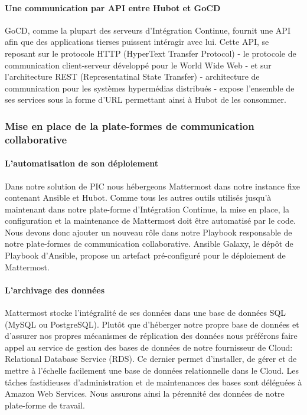           \paragraph{Une communication par API entre Hubot et GoCD}
          GoCD, comme la plupart des serveurs d'Intégration Continue, fournit une API afin que des applications tierses puissent intéragir avec lui. Cette API, se reposant sur le protocole HTTP (HyperText Transfer Protocol) - le protocole de communication client-serveur développé pour le World Wide Web - et sur l'architecture REST (Representatinal State Transfer) - architecture de communication pour les systèmes hypermédias distribués - expose l'ensemble de ses services sous la forme d'URL permettant ainsi à Hubot de les consommer.

        \subsubsection{Mise en place de la plate-formes de communication collaborative}

          \paragraph{L'automatisation de son déploiement}
          Dans notre solution de PIC nous hébergeons Mattermost dans notre instance fixe contenant Ansible et Hubot. Comme tous les autres outils utilisés jusqu'à maintenant dans notre plate-forme d'Intégration Continue, la mise en place, la configuration et la maintenance de Mattermost doit être automatisé par le code. Nous devons donc ajouter un nouveau rôle dans notre Playbook responsable de notre plate-formes de communication collaborative. Ansible Galaxy, le dépôt de Playbook d'Ansible, propose un artefact pré-configuré pour le déploiement de Mattermost.

          \paragraph{L'archivage des données}
          Mattermost stocke l'intégralité de ses données dans une base de données SQL (MySQL ou PostgreSQL). Plutôt que d'héberger notre propre base de données et d'assurer nos propres mécanismes de réplication des données nous préférons faire appel au service de gestion des bases de données de notre fournisseur de Cloud: Relational Database Service (RDS). Ce dernier permet d'installer, de gérer et de mettre à l'échelle facilement une base de données relationnelle dans le Cloud. Les tâches fastidieuses d'administration et de maintenances des bases sont déléguées à Amazon Web Services. Nous assurons ainsi la pérennité des données de notre plate-forme de travail.

